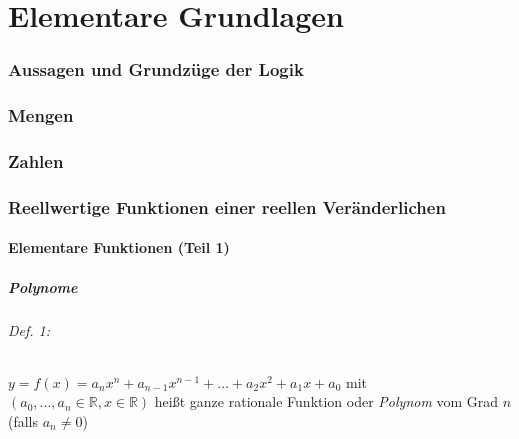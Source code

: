 





\maketitle
\newpage
\tableofcontents
\newpage


\part{Elementare Grundlagen}

\section{Aussagen und Grundzüge der Logik}
%

\section{Mengen}\label{sec:Mengen}
%

\section{Zahlen}
%

\section{Reellwertige Funktionen einer reellen Veränderlichen}
\subsection{Elementare Funktionen (Teil 1)}
\subsubsection{Polynome}
\paragraph{Def. 1:} \parskp
$y=f(x)=a_n x^n+a_{n-1}x^{n-1}+...+a_2 x^2+a_1 x+a_0$ mit $(a_0, ..., a_n \in \mathbb{R}, x\in \mathbb{R})$ heißt ganze rationale Funktion oder \emph{Polynom} vom Grad $n$ (falls $a_n \not = 0$)

